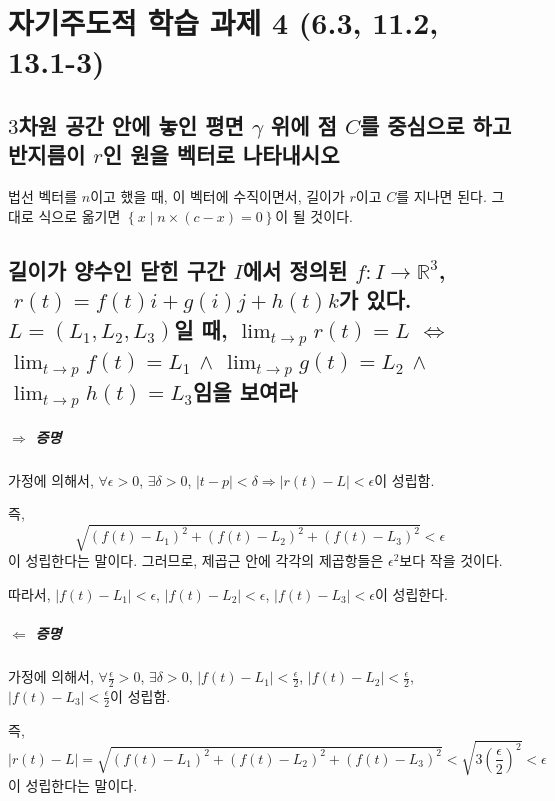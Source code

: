 \chapter{자기주도적 학습 과제 4 (6.3, 11.2, 13.1-3)}

\section{$3$차원 공간 안에 놓인 평면 $\gamma$ 위에 점 $C$를 중심으로 하고 반지름이 $r$인 원을 벡터로 나타내시오}
법선 벡터를 $n$이고 했을 때, 이 벡터에 수직이면서, 길이가 $r$이고 $C$를 지나면 된다.
그대로 식으로 옮기면 $\left\{ x \; | \; n \times (c - x) = 0\right\}$이 될 것이다.

\section{길이가 양수인 닫힌 구간 $I$에서 정의된 $f:I \to \mathbb{R}^3$, $\; r(t) = f(t)i+g(i)j+h(t) k$가 있다. $L=(L_1, L_2, L_3)$일 때, $\lim_{t \to p}r(t)=L$ $\iff$ $\lim_{t \to p}f(t)=L_1$ $\land$ $\lim_{t \to p}g(t)=L_2$ $\land$ $ \lim_{t \to p}h(t)=L_3 $임을 보여라}

\paragraph{$\Rightarrow$ 증명}
가정에 의해서, $\forall \epsilon >0$, $\exists \delta > 0$, $|t-p|<\delta \Rightarrow |r(t)-L|<\epsilon$이 성립함.

즉, $$\sqrt{\left(f(t)-L_1 \right)^2 + \left(f(t)-L_2 \right)^2 + \left(f(t)-L_3 \right)^2 } < \epsilon$$이 성립한다는 말이다.
그러므로, 제곱근 안에 각각의 제곱항들은 $\epsilon^2$보다 작을 것이다.

따라서, $\left|f(t)-L_1 \right| < \epsilon$,  $\left|f(t)-L_2 \right| < \epsilon$,  $\left|f(t)-L_3 \right| < \epsilon$이 성립한다.

\paragraph{$\Leftarrow$ 증명}

가정에 의해서, $\forall \frac{\epsilon}{2} >0$, $\exists \delta > 0$, $\left|f(t)-L_1 \right| < \frac{\epsilon}{2}$,  $\left|f(t)-L_2 \right| < \frac{\epsilon}{2}$,  $\left|f(t)-L_3 \right| < \frac{\epsilon}{2}$이 성립함.

즉, $$ |r(t)-L| = \sqrt{\left(f(t)-L_1 \right)^2 + \left(f(t)-L_2 \right)^2 + \left(f(t)-L_3 \right)^2 } < \sqrt{3\left(\frac{\epsilon}{2}\right)^2} < \epsilon$$이 성립한다는 말이다.


